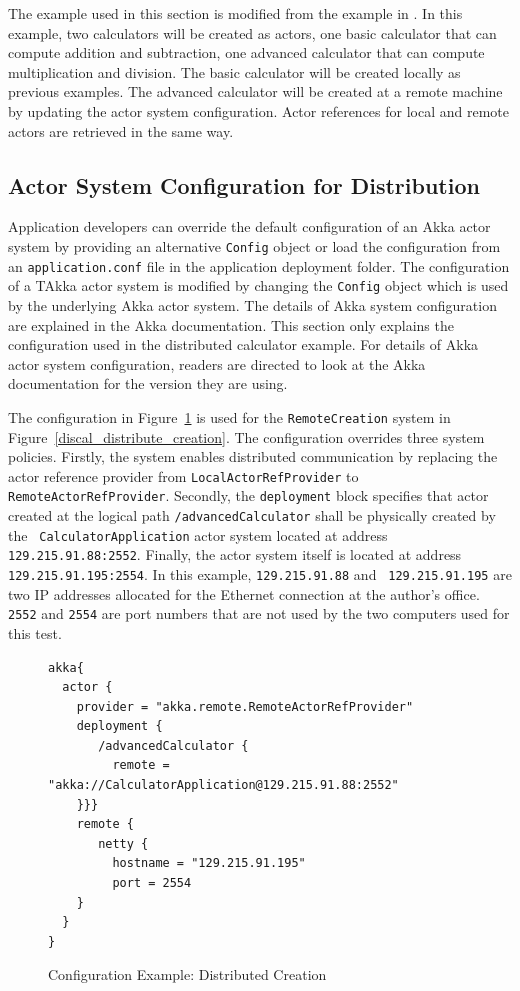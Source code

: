 The example used in this section is modified from the example in \citep[Section 
5.11]{akka_doc}.  In this example, two calculators will be created as actors, 
one basic calculator that can compute addition and subtraction, one 
advanced calculator that can compute multiplication and division.  The basic 
calculator will be created locally as previous examples.  The advanced 
calculator will be created at a remote machine by updating the actor system 
configuration.  Actor references for local and remote actors are retrieved in 
the same way.


\subsection{Actor System Configuration for Distribution}

Application developers can override the default configuration of an Akka actor 
system by providing an alternative {\tt Config} object or load the 
configuration from an {\tt application.conf} file in the application deployment 
folder. \citep{akka_doc}  The configuration of a TAkka actor system is 
modified by changing the {\tt Config} object which is used by the underlying 
Akka actor system.  The details of Akka system configuration are explained in 
the Akka documentation.  This section only explains the configuration used in 
the distributed calculator example.  For details of Akka actor system 
configuration, readers are directed to look at the Akka documentation for the 
version they are using.

The configuration in Figure~\ref{discal_distribute_configuration} is used 
for the {\tt RemoteCreation} system in Figure~\ref{discal_distribute_creation}. 
The configuration overrides three system policies.  Firstly, the system enables 
distributed communication by replacing the actor reference provider from 
{\tt LocalActorRefProvider} to {\tt RemoteActorRefProvider}.  Secondly, the 
{\tt deployment} block specifies that actor created at the logical path  
{\tt /advancedCalculator} shall be physically created by the {\tt 
CalculatorApplication} actor system located at address {\tt 
129.215.91.88:2552}.  Finally, the actor system itself is located at address
{\tt 129.215.91.195:2554}.   In this example, {\tt 129.215.91.88} and {\tt 
129.215.91.195} are two IP addresses allocated for the Ethernet connection at 
the author's office.  {\tt 2552} and {\tt 2554} are port numbers that are not 
used by the two computers used for this test.


\begin{figure}[h]
\begin{lstlisting}
akka{
  actor {
    provider = "akka.remote.RemoteActorRefProvider"
    deployment {
       /advancedCalculator {
         remote = "akka://CalculatorApplication@129.215.91.88:2552"
    }}}
    remote {
       netty {
         hostname = "129.215.91.195"
         port = 2554               
    }
  }
}
\end{lstlisting}
\caption{Configuration Example: Distributed Creation}
\label{discal_distribute_configuration}
\end{figure}

